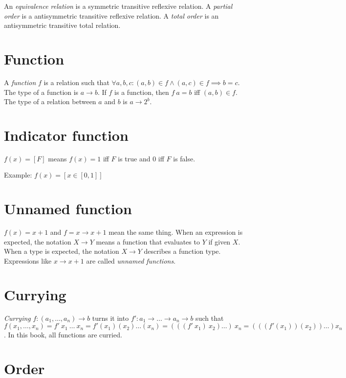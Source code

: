 %
%
An \emph{equivalence relation} is a symmetric transitive reflexive relation.
%
%
%
%
A \emph{partial order} is a antisymmetric transitive reflexive relation.
A \emph{total order} is an antisymmetric transitive total relation.

\section{Function}

%
A \emph{function} \(f\) is a relation such that
\(\forall a, b, c : (a,b) \in f \wedge (a,c) \in f \implies b = c\).
The type of a function is \(a \to b\).
If \(f\) is a function, then \(f~a = b\) iff \((a,b) \in f\).
The type of a relation between \(a\) and \(b\) is \(a \to 2^b\).

\section{Indicator function}

\(f(x) = [F]\) means \(f(x) = 1\)
iff \(F\) is true
and \(0\) iff \(F\) is false.

Example: \(f(x) = [x \in [0,1]]\)

\section{Unnamed function}

\(f(x) = x + 1\) and \(f = x \to x+1\) mean the same thing.
When an expression is expected, the notation \(X \to Y\)
means a function that evaluates to \(Y\) if given \(X\).
When a type is expected, the notation \(X \to Y\) describes a function type.
Expressions like \(x \to x + 1\) are called \emph{unnamed functions}.

\section{Currying}

%
%
\emph{Currying} \(f : (a_1,\ldots,a_n) \to b\) turns it into \(f' : a_1 \to \ldots \to a_n \to b\)
such that \(f(x_1,\ldots,x_n)
= f'~x_1~\ldots~x_n
= f'(x_1)(x_2)\ldots(x_n)
= (((f'~x_1)~x_2)\ldots)~x_n
= (((f'(x_1))(x_2))\ldots)x_n\).
In this book, all functions are curried.

\section{Order}

